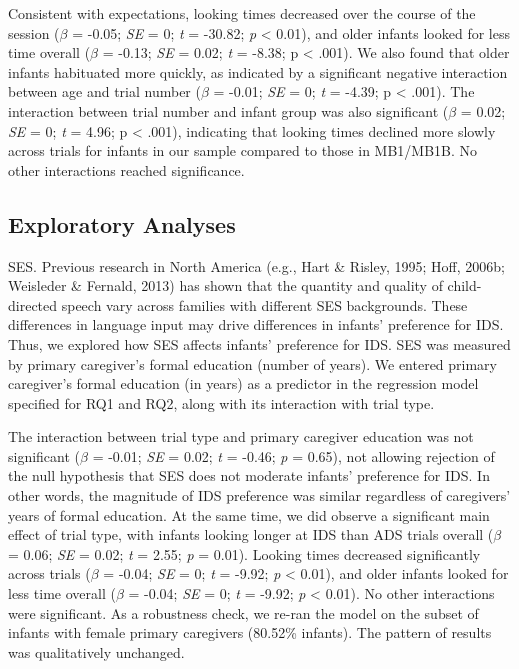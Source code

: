 \documentclass[
  ,man,floatsintext]{apa6}
\begin{document}
Consistent with expectations, looking times decreased over the course of the session (\emph{\(\beta\)} = -0.05; \emph{SE} = 0; \emph{t} = -30.82; \emph{p} \textless{} 0.01), and older infants looked for less time overall (\emph{\(\beta\)} = -0.13; \emph{SE} = 0.02; \emph{t} = -8.38; p \textless{} .001). We also found that older infants habituated more quickly, as indicated by a significant negative interaction between age and trial number (\emph{\(\beta\)} = -0.01; \emph{SE} = 0; \emph{t} = -4.39; p \textless{} .001). The interaction between trial number and infant group was also significant (\emph{\(\beta\)} = 0.02; \emph{SE} = 0; \emph{t} = 4.96; p \textless{} .001), indicating that looking times declined more slowly across trials for infants in our sample compared to those in MB1/MB1B. No other interactions reached significance.

\hypertarget{exploratory-analyses}{%
\subsection{Exploratory Analyses}\label{exploratory-analyses}}

SES. Previous research in North America (e.g., Hart \& Risley, 1995; Hoff, 2006b; Weisleder \& Fernald, 2013) has shown that the quantity and quality of child-directed speech vary across families with different SES backgrounds. These differences in language input may drive differences in infants' preference for IDS. Thus, we explored how SES affects infants' preference for IDS. SES was measured by primary caregiver's formal education (number of years). We entered primary caregiver's formal education (in years) as a predictor in the regression model specified for RQ1 and RQ2, along with its interaction with trial type.

The interaction between trial type and primary caregiver education was not significant (\emph{\(\beta\)} = -0.01; \emph{SE} = 0.02; \emph{t} = -0.46; \emph{p} = 0.65), not allowing rejection of the null hypothesis that SES does not moderate infants' preference for IDS. In other words, the magnitude of IDS preference was similar regardless of caregivers' years of formal education. At the same time, we did observe a significant main effect of trial type, with infants looking longer at IDS than ADS trials overall (\emph{\(\beta\)} = 0.06; \emph{SE} = 0.02; \emph{t} = 2.55; \emph{p} = 0.01). Looking times decreased significantly across trials (\emph{\(\beta\)} = -0.04; \emph{SE} = 0; \emph{t} = -9.92; \emph{p} \textless{} 0.01), and older infants looked for less time overall (\emph{\(\beta\)} = -0.04; \emph{SE} = 0; \emph{t} = -9.92; \emph{p} \textless{} 0.01). No other interactions were significant. As a robustness check, we re-ran the model on the subset of infants with female primary caregivers (80.52\% infants). The pattern of results was qualitatively unchanged.
\end{document}
